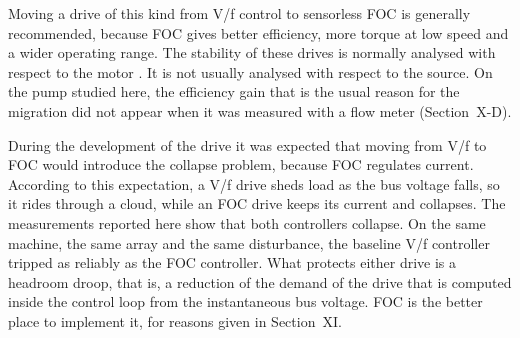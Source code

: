 \documentclass[journal]{IEEEtran}
\begin{document}
Moving a drive of this kind from V/f control to sensorless FOC \cite{r6,r7} is generally recommended, because FOC gives better efficiency, more torque at low speed and a wider operating range. The stability of these drives is normally analysed with respect to the motor \cite{r2,r3,r4,r5}. It is not usually analysed with respect to the source. On the pump studied here, the efficiency gain that is the usual reason for the migration did not appear when it was measured with a flow meter (Section~X-D).

During the development of the drive it was expected that moving from V/f to FOC would introduce the collapse problem, because FOC regulates current. According to this expectation, a V/f drive sheds load as the bus voltage falls, so it rides through a cloud, while an FOC drive keeps its current and collapses. The measurements reported here show that both controllers collapse. On the same machine, the same array and the same disturbance, the baseline V/f controller tripped as reliably as the FOC controller. What protects either drive is a headroom droop, that is, a reduction of the demand of the drive that is computed inside the control loop from the instantaneous bus voltage. FOC is the better place to implement it, for reasons given in Section~XI.
\end{document}
